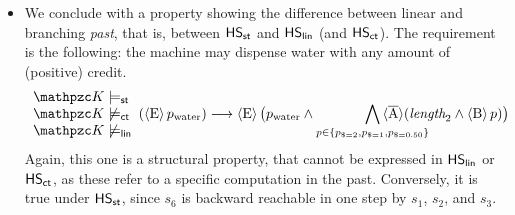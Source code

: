 \begin{itemize}
    \item We conclude with a property showing the difference between linear and branching \emph{past}, that is, between $\text{\sffamily HS}_{\mathsf{st}}$ and $\text{\sffamily HS}_{\mathsf{lin}}$ (and $\text{\sffamily HS}_{\mathsf{ct}}$).
    The requirement is the following: the machine may dispense water with any amount of (positive) credit.
    \[
        \begin{array}{l}
            \Ku\models_\stat \\
            \Ku\not\models_\LinearPast  \\
            \Ku\not\models_\LinearTime
        \end{array}
         (\hsE p_\text{water})\longrightarrow \hsE\big(p_\text{water}\wedge\smashoperator[r]{\bigwedge_{p\in\{p_\text{\$=2},p_\text{\$=1},p_\text{\$=0.50}\}}}\hsAt(\Length_{2} \wedge\hsB p)\big)
    \]
    Again, this one is a structural property, that cannot be expressed in $\text{\sffamily HS}_{\mathsf{lin}}$ or $\text{\sffamily HS}_{\mathsf{ct}}$, as these refer to a specific computation in the past. Conversely, it is true under $\text{\sffamily HS}_{\mathsf{st}}$, since $s_6$ is backward reachable in one step by $s_1$, $s_2$, and $s_3$.
\end{itemize}